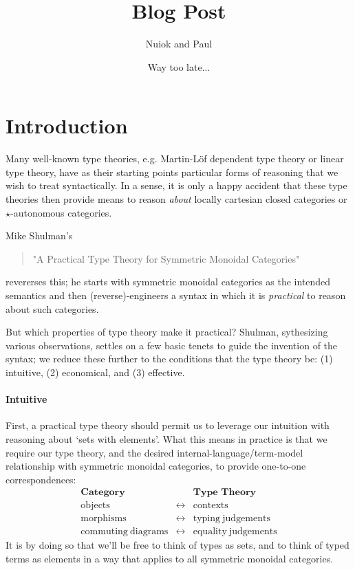 \documentclass[pra,floatfix,
amsmath,superscriptaddress, 12pt]{article}
\title{Blog Post}
\author{Nuiok and Paul }
\date{Way too late...}
\theoremstyle{definition}
\begin{document}
\maketitle



\section{Introduction}

Many well-known type theories, e.g. Martin-L\"{o}f dependent type theory or linear type theory, have as their starting points particular forms of reasoning that we wish to treat syntactically. In a sense, it is only a happy accident that these type theories then provide means to reason \emph{about} locally cartesian closed categories or $\star$-autonomous categories.

Mike Shulman's 
\begin{quotation}
    "A Practical Type Theory for Symmetric Monoidal Categories"
\end{quotation}
revererses this; he starts with symmetric monoidal categories as the intended semantics and then (reverse)-engineers a syntax in which it is \emph{practical} to reason about such categories.

But which properties of type theory make it practical? Shulman, sythesizing various observations, settles on a few basic tenets to guide the invention of the syntax; we reduce these further to the conditions that the type theory be: (1) intuitive, (2) economical, and (3) effective.

\paragraph{Intuitive} First, a practical type theory should permit us to leverage our intuition with reasoning about `sets with elements'. What this means in practice is that we require our type theory, and the desired internal-language/term-model relationship with symmetric monoidal categories, to provide one-to-one correspondences:
\begin{eqnarray*}
\textbf{Category}              &  & \textbf{Type Theory}\\
\mathrm{objects}                & \longleftrightarrow & \mathrm{contexts}\\
\mathrm{morphisms}              & \longleftrightarrow & \mathrm{typing\ judgements}\\
\mathrm{commuting\ diagrams}     & \longleftrightarrow & \mathrm{equality\ judgements}
\end{eqnarray*}
It is by doing so that we'll be free to think of types as sets, and to think of typed terms as elements in a way that applies to all symmetric monoidal categories.
\end{document}
